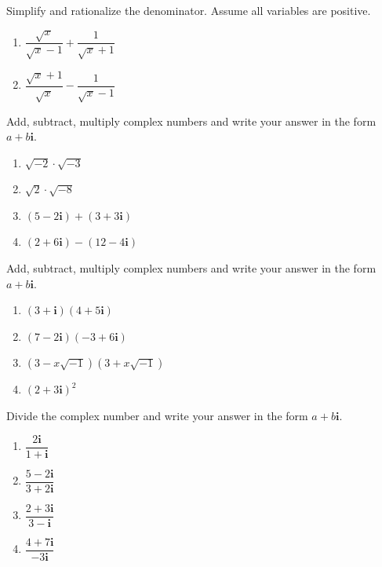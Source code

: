 \documentclass[en,12pt]{elegantbook}
\providecommand{\tightlist}{%
  \setlength{\itemsep}{0pt}\setlength{\parskip}{0pt}}
\newcommand{\ii}{\mathbf{i}}
\providecommand{\tightlist}{%
  \setlength{\itemsep}{0pt}\setlength{\parskip}{0pt}}
\let\BeginKnitrBlock\begin \let\EndKnitrBlock\end
\begin{document}
\BeginKnitrBlock{exercise}
\protect\hypertarget{exr:unnamed-chunk-104}{}{\label{exr:unnamed-chunk-104} }
Simplify and rationalize the denominator. Assume all variables are positive.

\begin{enumerate}
\def\labelenumi{\arabic{enumi}.}
\tightlist
\item
  \(\dfrac{\sqrt{x}}{\sqrt x-1}+\dfrac{1}{\sqrt{x}+1}\)
\item
  \(\dfrac{\sqrt{x}+1}{\sqrt x}-\dfrac{1}{\sqrt{x}-1}\)
\end{enumerate}
\EndKnitrBlock{exercise}

\BeginKnitrBlock{exercise}
\protect\hypertarget{exr:unnamed-chunk-105}{}{\label{exr:unnamed-chunk-105} }
Add, subtract, multiply complex numbers and write your answer in the form \(a+b\ii\).

\begin{enumerate}
\def\labelenumi{\arabic{enumi}.}
\tightlist
\item
  \(\sqrt{-2}\cdot\sqrt{-3}\)
\item
  \(\sqrt{2}\cdot\sqrt{-8}\)
\item
  \((5-2\ii)+(3+3\ii)\)
\item
  \((2+6\ii)-(12-4\ii)\)
\end{enumerate}
\EndKnitrBlock{exercise}

\BeginKnitrBlock{exercise}
\protect\hypertarget{exr:unnamed-chunk-106}{}{\label{exr:unnamed-chunk-106} }
Add, subtract, multiply complex numbers and write your answer in the form \(a+b\ii\).

\begin{enumerate}
\def\labelenumi{\arabic{enumi}.}
\tightlist
\item
  \((3+\ii)(4+5\ii)\)
\item
  \((7-2\ii)(-3+6\ii)\)
\item
  \((3-x\sqrt{-1})(3+x\sqrt{-1})\)
\item
  \((2+3\ii)^2\)
\end{enumerate}
\EndKnitrBlock{exercise}

\BeginKnitrBlock{exercise}
\protect\hypertarget{exr:unnamed-chunk-107}{}{\label{exr:unnamed-chunk-107} }
Divide the complex number and write your answer in the form \(a+b\ii\).

\begin{enumerate}
\def\labelenumi{\arabic{enumi}.}
\tightlist
\item
  \(\dfrac{2\ii}{1+\ii}\)
\item
  \(\dfrac{5-2\ii}{3+2\ii}\)
\item
  \(\dfrac{2+3\ii}{3-\ii}\)
\item
  \(\dfrac{4+7\ii}{-3\ii}\)
\end{enumerate}
\EndKnitrBlock{exercise}
\end{document}
